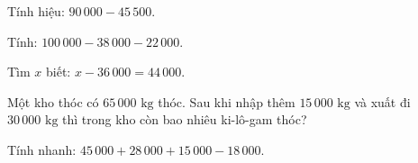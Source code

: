\begin{ex} %
Tính hiệu: $90\,000 - 45\,500$.
\end{ex}

\begin{ex} %
Tính: $100\,000 - 38\,000 - 22\,000$.
\end{ex}

\begin{ex} %
Tìm $x$ biết: $x - 36\,000 = 44\,000$.
\end{ex}

\begin{ex} %
Một kho thóc có $65\,000\text{ kg}$ thóc. Sau khi nhập thêm $15\,000\text{ kg}$ và xuất đi $30\,000\text{ kg}$ thì trong kho còn bao nhiêu ki-lô-gam thóc?
\end{ex}

\begin{ex} %
Tính nhanh: $45\,000 + 28\,000 + 15\,000 - 18\,000$.
\end{ex}
